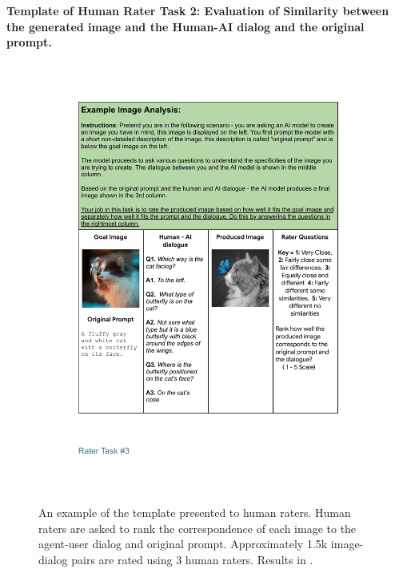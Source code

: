 \textbf{Template of Human Rater Task 2: Evaluation of Similarity between the generated image and the Human-AI dialog and the original prompt.} 
\begin{figure} [H]
    \centering
    \includegraphics[width=.9\linewidth]{figures/Task_2.pdf}
    \caption{An example of the template presented to human raters. Human raters are asked to rank the correspondence of each image to the agent-user dialog and original prompt. Approximately 1.5k image-dialog pairs are rated using 3 human raters. Results in .}
    \label{fig:interface-human-model-task-2}
\end{figure} 
\clearpage


